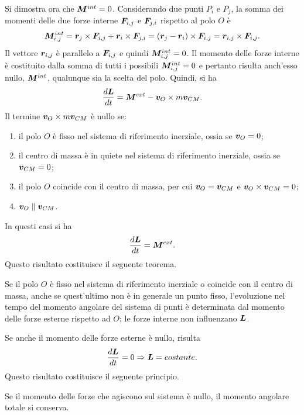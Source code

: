 Si dimostra ora che $\bm{M}^{int}=0$. Considerando due punti $P_i$ e $P_j$, la somma dei momenti delle due forze interne $\bm{F}_{i,j}$ e $\bm{F}_{j,i}$ rispetto al polo $O$ è
\begin{equation}
    \bm{M}_{i,j}^{int}=\bm{r}_j\times\bm{F}_{i,j}+\bm{r}_i\times\bm{F}_{j,i}=(\bm{r}_j-\bm{r}_i)\times\bm{F}_{i,j}=\bm{r}_{i,j}\times\bm{F}_{i,j}.
\end{equation}
Il vettore $\bm{r}_{i,j}$ è parallelo a $\bm{F}_{i,j}$ e quindi $\bm{M}_{i,j}^{int}=0$. Il momento delle forze interne è costituito dalla somma di tutti i possibili $\bm{M}_{i,j}^{int}=0$ e pertanto risulta anch'esso nullo, $\bm{M}^{int}$, qualunque sia la scelta del polo. Quindi, si ha
\begin{equation}
    \frac{d\bm{L}}{dt}=\bm{M}^{ext}-\bm{v}_O\times m\bm{v}_{CM}.
\end{equation}
\newpage
\noindent
Il termine $\bm{v}_O\times m\bm{v}_{CM}$ è nullo se:
\begin{enumerate}
    \item il polo $O$ è fisso nel sistema di riferimento inerziale, ossia se $\bm{v}_O=0$;
    \item il centro di massa è in quiete nel sistema di riferimento inerziale, ossia se $\bm{v}_{CM}=0$;
    \item il polo $O$ coincide con il centro di massa, per cui $\bm{v}_O=\bm{v}_{CM}$ e $\bm{v}_O\times\bm{v}_{CM}=0$;
    \item $\bm{v}_O\parallel\bm{v}_{CM}$.
\end{enumerate}
In questi casi si ha
\begin{equation}
    \frac{d\bm{L}}{dt}=\bm{M}^{ext}.
\end{equation}
Questo risultato costituisce il seguente teorema.
\begin{teo}
    Se il polo $O$ è fisso nel sistema di riferimento inerziale o coincide con il centro di massa, anche se quest'ultimo non è in generale un punto fisso, l'evoluzione nel tempo del momento angolare del sistema di punti è determinata dal momento delle forze esterne rispetto ad $O$; le forze interne non influenzano $\bm{L}$.
\end{teo} 
Se anche il momento delle forze esterne è nullo, risulta
\begin{equation}
    \frac{d\bm{L}}{dt}=0\Rightarrow\bm{L}=costante.
\end{equation}
Questo risultato costituisce il seguente principio.
\begin{teo}
     Se il momento delle forze che agiscono sul sistema è nullo, il momento angolare totale si conserva. 
\end{teo}
